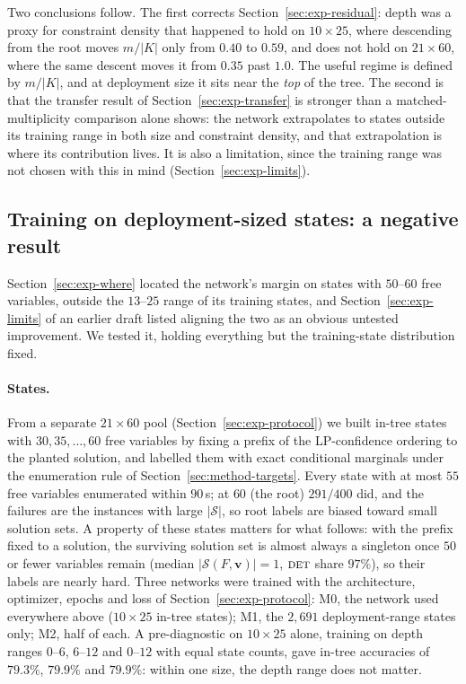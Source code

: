 \documentclass[final,5p,times,twocolumn]{elsarticle}
\newcommand{\SOL}{\mathcal{S}}
\newcommand{\FORCED}{\textsc{det}}
\begin{document}
Two conclusions follow. The first corrects Section~\ref{sec:exp-residual}: depth was a proxy for constraint density that happened to hold on $10\times25$, where descending from the root moves $m/|K|$ only from $0.40$ to $0.59$, and does not hold on $21\times60$, where the same descent moves it from $0.35$ past $1.0$. The useful regime is defined by $m/|K|$, and at deployment size it sits near the \emph{top} of the tree. The second is that the transfer result of Section~\ref{sec:exp-transfer} is stronger than a matched-multiplicity comparison alone shows: the network extrapolates to states outside its training range in both size and constraint density, and that extrapolation is where its contribution lives. It is also a limitation, since the training range was not chosen with this in mind (Section~\ref{sec:exp-limits}).

\subsection{Training on deployment-sized states: a negative result}
\label{sec:exp-range}

Section~\ref{sec:exp-where} located the network's margin on states with $50$--$60$ free variables, outside the $13$--$25$ range of its training states, and Section~\ref{sec:exp-limits} of an earlier draft listed aligning the two as an obvious untested improvement. We tested it, holding everything but the training-state distribution fixed.

\paragraph{States.} From a separate $21\times60$ pool (Section~\ref{sec:exp-protocol}) we built in-tree states with $30,35,\dots,60$ free variables by fixing a prefix of the LP-confidence ordering to the planted solution, and labelled them with exact conditional marginals under the enumeration rule of Section~\ref{sec:method-targets}. Every state with at most $55$ free variables enumerated within $90$\,s; at $60$ (the root) $291/400$ did, and the failures are the instances with large $|\SOL|$, so root labels are biased toward small solution sets. A property of these states matters for what follows: with the prefix fixed to a solution, the surviving solution set is almost always a singleton once $50$ or fewer variables remain (median $|\SOL(F,\mathbf{v})|=1$, $\FORCED$ share $97\%$), so their labels are nearly hard. Three networks were trained with the architecture, optimizer, epochs and loss of Section~\ref{sec:exp-protocol}: \textsc{M0}, the network used everywhere above ($10\times25$ in-tree states); \textsc{M1}, the $2{,}691$ deployment-range states only; \textsc{M2}, half of each. A pre-diagnostic on $10\times25$ alone, training on depth ranges $0$--$6$, $6$--$12$ and $0$--$12$ with equal state counts, gave in-tree accuracies of $79.3\%$, $79.9\%$ and $79.9\%$: within one size, the depth range does not matter.
\end{document}
